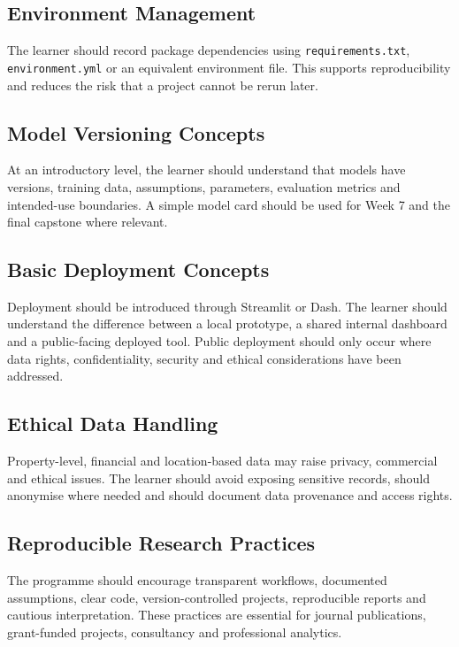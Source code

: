 \documentclass[
  a4paper,
]{article}
\begin{document}
\subsection{Environment Management}\label{environment-management}

The learner should record package dependencies using
\texttt{requirements.txt}, \texttt{environment.yml} or an equivalent
environment file. This supports reproducibility and reduces the risk
that a project cannot be rerun later.

\subsection{Model Versioning Concepts}\label{model-versioning-concepts}

At an introductory level, the learner should understand that models have
versions, training data, assumptions, parameters, evaluation metrics and
intended-use boundaries. A simple model card should be used for Week 7
and the final capstone where relevant.

\subsection{Basic Deployment Concepts}\label{basic-deployment-concepts}

Deployment should be introduced through Streamlit or Dash. The learner
should understand the difference between a local prototype, a shared
internal dashboard and a public-facing deployed tool. Public deployment
should only occur where data rights, confidentiality, security and
ethical considerations have been addressed.

\subsection{Ethical Data Handling}\label{ethical-data-handling}

Property-level, financial and location-based data may raise privacy,
commercial and ethical issues. The learner should avoid exposing
sensitive records, should anonymise where needed and should document
data provenance and access rights.

\subsection{Reproducible Research
Practices}\label{reproducible-research-practices}

The programme should encourage transparent workflows, documented
assumptions, clear code, version-controlled projects, reproducible
reports and cautious interpretation. These practices are essential for
journal publications, grant-funded projects, consultancy and
professional analytics.
\end{document}
